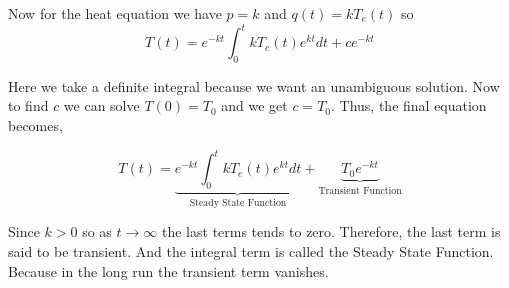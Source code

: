 Now for the heat equation we have $p = k$ and $q(t) = kT_e(t)$ so
$$
T(t) = e^{-kt} \int_0^t k T_e(t) e^{kt} dt + c e^{-kt}
$$

Here we take a definite integral because we want an unambiguous solution.
Now to find $c$ we can solve $T(0) = T_0$ and we get $c = T_0$.
Thus, the final equation becomes,

$$
T(t) = \underbrace{ e^{-kt} \int_0^t k T_e(t) e^{kt} dt }_{\text{Steady State Function}} + \underbrace{T_0 e^{-kt}}_{\text{Transient Function}}
$$

Since $k > 0$ so as $t \to \infty$ the last terms tends to zero.
Therefore, the last term is said to be transient. And the integral term is called the Steady State Function.
Because in the long run the transient term vanishes.

